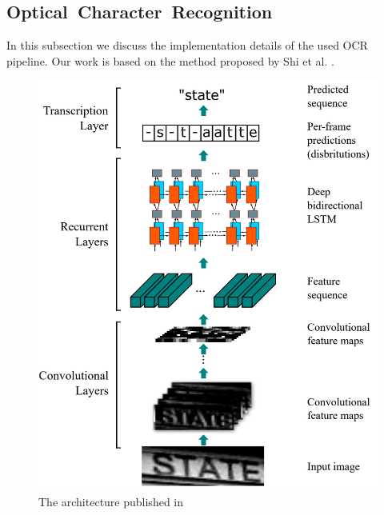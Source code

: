 \subsection{Optical~Character~Recognition}
\label{subsec:ocr}


In this subsection we discuss the implementation details of the used \ac{OCR} pipeline.
Our work is based on the method proposed by Shi et al. \cite{7801919}.
\begin{figure}
	\includegraphics[width=\textwidth]{figures/crnn.png}
	\caption{The architecture published in \cite{7801919}}
	\label{fig:ocr_architecture}
\end{figure}








